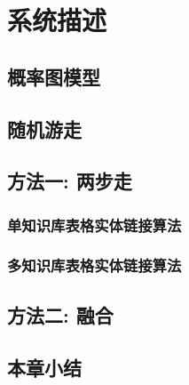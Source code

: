 \chapter{系统描述}

\section{概率图模型}

\section{随机游走}

\section{方法一: 两步走}

\subsection{单知识库表格实体链接算法}

\subsection{多知识库表格实体链接算法}


\section{方法二: 融合}

\section{本章小结}
